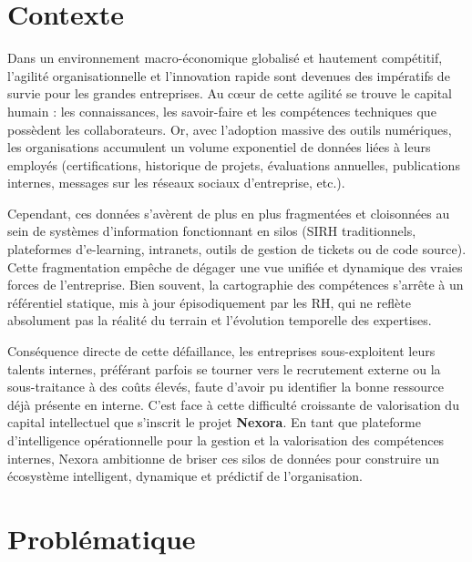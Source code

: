 \documentclass[12pt,a4paper]{article}
\begin{document}
\section{Contexte}

Dans un environnement macro-économique globalisé et hautement compétitif, l'agilité organisationnelle et l'innovation rapide sont devenues des impératifs de survie pour les grandes entreprises. Au cœur de cette agilité se trouve le capital humain : les connaissances, les savoir-faire et les compétences techniques que possèdent les collaborateurs. Or, avec l'adoption massive des outils numériques, les organisations accumulent un volume exponentiel de données liées à leurs employés (certifications, historique de projets, évaluations annuelles, publications internes, messages sur les réseaux sociaux d'entreprise, etc.).

Cependant, ces données s'avèrent de plus en plus fragmentées et cloisonnées au sein de systèmes d'information fonctionnant en silos (SIRH traditionnels, plateformes d'e-learning, intranets, outils de gestion de tickets ou de code source). Cette fragmentation empêche de dégager une vue unifiée et dynamique des vraies forces de l'entreprise. Bien souvent, la cartographie des compétences s'arrête à un référentiel statique, mis à jour épisodiquement par les RH, qui ne reflète absolument pas la réalité du terrain et l'évolution temporelle des expertises. 

Conséquence directe de cette défaillance, les entreprises sous-exploitent leurs talents internes, préférant parfois se tourner vers le recrutement externe ou la sous-traitance à des coûts élevés, faute d'avoir pu identifier la bonne ressource déjà présente en interne. C’est face à cette difficulté croissante de valorisation du capital intellectuel que s'inscrit le projet \textbf{Nexora}. En tant que plateforme d'intelligence opérationnelle pour la gestion et la valorisation des compétences internes, Nexora ambitionne de briser ces silos de données pour construire un écosystème intelligent, dynamique et prédictif de l'organisation.

\section{Problématique}
\end{document}
